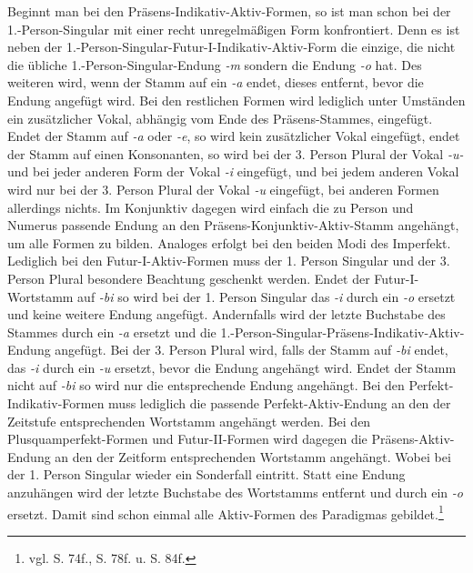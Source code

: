 Beginnt man bei den Präsens-Indikativ-Aktiv-Formen, so ist man schon bei der 1.-Person-Singular mit einer recht unregelmäßigen Form konfrontiert. Denn es ist neben der 1.-Person-Singular-Futur-I-Indikativ-Aktiv-Form die einzige, die nicht die übliche 1.-Person-Singular-Endung \textit{-m} sondern die Endung \textit{-o} hat. Des weiteren wird, wenn der Stamm auf ein \textit{-a} endet, dieses entfernt, bevor die Endung angefügt wird. Bei den restlichen Formen wird lediglich unter Umständen ein zusätzlicher Vokal, abhängig vom Ende des Präsens-Stammes, eingefügt. Endet der Stamm auf \textit{-a} oder \textit{-e}, so wird kein zusätzlicher Vokal eingefügt, endet der Stamm auf einen Konsonanten, so wird bei der 3. Person Plural der Vokal \textit{-u-} und bei jeder anderen Form der Vokal \textit{-i} eingefügt, und bei jedem anderen Vokal wird nur bei der 3. Person Plural der Vokal \textit{-u} eingefügt, bei anderen Formen allerdings nichts. Im Konjunktiv dagegen wird einfach die zu Person und Numerus passende Endung an den Präsens-Konjunktiv-Aktiv-Stamm angehängt, um alle Formen zu bilden. Analoges erfolgt bei den beiden Modi des Imperfekt. Lediglich bei den Futur-I-Aktiv-Formen muss der 1. Person Singular und der 3. Person Plural besondere Beachtung geschenkt werden. Endet der Futur-I-Wortstamm auf \textit{-bi} so wird bei der 1. Person Singular das \textit{-i} durch ein \textit{-o} ersetzt und keine weitere Endung angefügt. Andernfalls wird der letzte Buchstabe des Stammes durch ein \textit{-a} ersetzt und die 1.-Person-Singular-Präsens-Indikativ-Aktiv-Endung angefügt. Bei der 3. Person Plural wird, falls der Stamm auf \textit{-bi} endet, das \textit{-i} durch ein \textit{-u} ersetzt, bevor die Endung angehängt wird. Endet der Stamm nicht auf \textit{-bi} so wird nur die entsprechende Endung angehängt. Bei den Perfekt-Indikativ-Formen muss lediglich die passende Perfekt-Aktiv-Endung an den der Zeitstufe entsprechenden Wortstamm angehängt werden. Bei den Plusquamperfekt-Formen und Futur-II-Formen wird dagegen die Präsens-Aktiv-Endung an den der Zeitform entsprechenden Wortstamm angehängt. Wobei bei der 1. Person Singular wieder ein Sonderfall eintritt. Statt eine Endung anzuhängen wird der letzte Buchstabe des Wortstamms entfernt und durch ein \textit{-o} ersetzt. Damit sind schon einmal alle Aktiv-Formen des Paradigmas gebildet.\footnote{vgl. \cite{BAYER-LINDAUER1994} S. 74f., S. 78f. u. S. 84f.} \par
